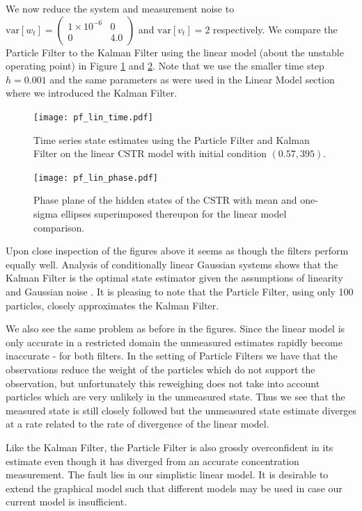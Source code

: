 \documentclass[../masters.tex]{subfiles}
\begin{document}
We now reduce the system and measurement noise to $\text{var}[w_t] = \begin{pmatrix}
1\times 10^{-6} & 0 \\ 0 & 4.0 
\end{pmatrix}$  and  $\text{var}[v_t] = 2$ respectively. We compare the Particle Filter to the Kalman Filter using the linear model (about the unstable operating point) in Figure \ref{fig_pflintime} and \ref{fig_pflinphase}. Note that we use the smaller time step $h=0.001$ and the same parameters as were used in the Linear Model section where we introduced the Kalman Filter. 
\begin{figure}[H] 
\centering
\texttt{[image: pf\_lin\_time.pdf]}
\caption{Time series state estimates using the Particle Filter and Kalman Filter on the linear CSTR model with initial condition $(0.57, 395)$.}
\label{fig_pflintime}
\end{figure}
\begin{figure}[H] 
\centering
\texttt{[image: pf\_lin\_phase.pdf]}
\caption{Phase plane of the hidden states of the CSTR with mean and one-sigma ellipses superimposed thereupon for the linear model comparison.}
\label{fig_pflinphase}
\end{figure}
Upon close inspection of the figures above it seems as though the filters perform equally well. Analysis of conditionally linear Gaussian systems shows that the Kalman Filter is the optimal state estimator given the assumptions of linearity and Gaussian noise \cite{shalom}. It is pleasing to note that the Particle Filter, using only 100 particles, closely approximates the Kalman Filter. 

We also see the same problem as before in the figures. Since the linear model is only accurate in a restricted domain the unmeasured estimates rapidly become inaccurate - for both filters. In the setting of Particle Filters we have that the observations reduce the weight of the particles which do not support the observation, but unfortunately this reweighing does not take into account particles which are very unlikely in the unmeasured state. Thus we see that the measured state is still closely followed but the unmeasured state estimate diverges at a rate related to the rate of divergence of the linear model. 

Like the Kalman Filter, the Particle Filter is also grossly overconfident in its estimate even though it has diverged from an accurate concentration measurement. The fault lies in our simplistic linear model. It is desirable to extend the graphical model such that different models may be used in case our current model is insufficient. 



\end{document}
